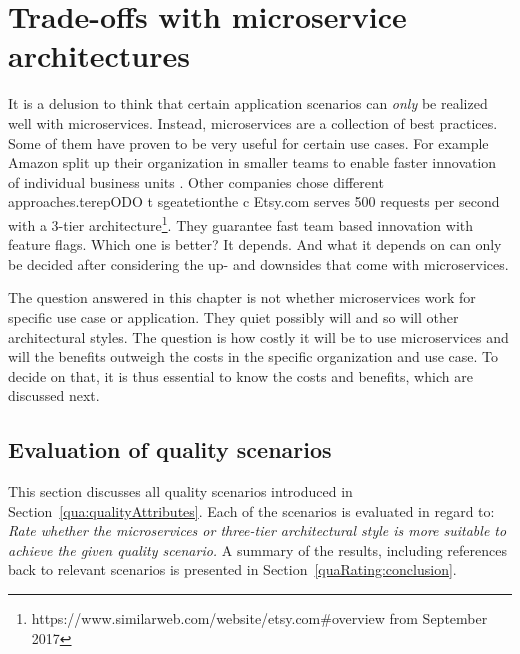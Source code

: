 \chapter{Trade-offs with microservice architectures}
\label{qua:qualitiesRating}


It is a delusion to think that certain application scenarios can \textit{only} be realized well with microservices.
Instead, microservices are a collection of best practices.
Some of them have proven to be very useful for certain use cases.
For example Amazon split up their organization in smaller teams to enable faster innovation of individual business units \cite{Vogels2006}.
Other companies chose different approaches.terepODO t sgeatetionthe c
Etsy.com serves 500 requests per second with a 3-tier architecture\footnote{https://www.similarweb.com/website/etsy.com\#overview from September 2017}.
They guarantee fast team based innovation with feature flags.
Which one is better?
It depends.
And what it depends on can only be decided after considering the up- and downsides that come with microservices.

The question answered in this chapter is not whether microservices work for specific use case or application.
They quiet possibly will and so will other architectural styles.
The question is how costly it will be to use microservices and will the benefits outweigh the costs in the specific organization and use case.
To decide on that, it is thus essential to know the costs and benefits, which are discussed next.

\section{Evaluation of quality scenarios}
\label{quaMicro:rating}

This section discusses all quality scenarios introduced in Section~\ref{qua:qualityAttributes}.
Each of the scenarios is evaluated in regard to:
\textit{Rate whether the microservices or three-tier architectural style is more suitable to achieve the given quality scenario.}
A summary of the results, including references back to relevant scenarios is presented in Section~\ref{quaRating:conclusion}.

